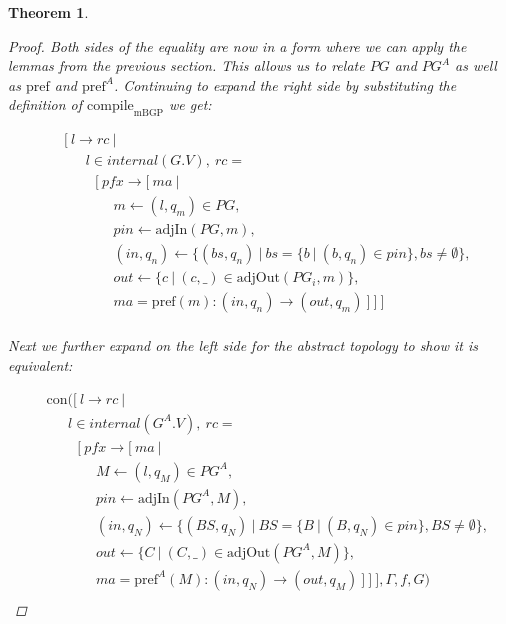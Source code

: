 \documentclass[twocolumn, openany]{sig-alternate-10pt}
\newcommand{\Con}{\mathrm{con}}
\newcommand{\CompileMbgp}{\ensuremath{\mathrm{compile}_\mathrm{mBGP}}}
\newcommand{\Pref}{\ensuremath{\mathrm{pref}}}
\newtheorem{thm}{Theorem}
\begin{document}
\begin{thm}
\begin{proof}
    Both sides of the equality are now in a form where we can apply the lemmas from the previous section.
    This allows us to relate $PG$ and $PG^A$ as well as $\Pref$ and $\Pref^A$.
    Continuing to expand the right side by substituting the definition of $\CompileMbgp$ we get: 

  \[ \begin{array}{l}
     ~~~~~ [~ l \rightarrow rc ~\vert~ \\
     ~~~~~~~~~~~~ l \in internal(G.V), ~rc =  \\
     ~~~~~~~~~~~~~~~ [~ pfx \rightarrow [~ ma ~\vert~ \\
     ~~~~~~~~~~~~~~~~~~~~~ m \leftarrow (l,q_m) \in PG, \\
     ~~~~~~~~~~~~~~~~~~~~~ pin \leftarrow \text{adjIn}(PG,m), \\
     ~~~~~~~~~~~~~~~~~~~~~ (in,q_n) \leftarrow \{ (bs,q_n) ~\vert~ bs=\{b ~\vert~ (b,q_n) \in pin \}, bs \neq \emptyset \}, \\
     ~~~~~~~~~~~~~~~~~~~~~ out \leftarrow \{ c ~\vert~ (c,\_) \in \text{adjOut}(PG_i,m) \}, \\
     ~~~~~~~~~~~~~~~~~~~~~ ma = \Pref(m) : (in,q_n) \rightarrow (out,q_m) ~] ~] ~]\\
  \end{array} \]%

  Next we further expand on the left side for the abstract topology to show it is equivalent:

  \[ \begin{array}{l}
     ~~~~~ \Con([~ l \rightarrow rc ~\vert~ \\
     ~~~~~~~~~~~~ l \in internal(G^A.V), ~rc =  \\
     ~~~~~~~~~~~~~~~ [~ pfx \rightarrow [~ ma ~\vert~ \\
     ~~~~~~~~~~~~~~~~~~~~~ M \leftarrow (l,q_M) \in PG^A, \\
     ~~~~~~~~~~~~~~~~~~~~~ pin \leftarrow \text{adjIn}(PG^A,M), \\
     ~~~~~~~~~~~~~~~~~~~~~ (in,q_N) \leftarrow \{ (BS,q_N) ~\vert~ BS=\{B ~\vert~ (B,q_N) \in pin \}, BS \neq \emptyset \}, \\
     ~~~~~~~~~~~~~~~~~~~~~ out \leftarrow \{ C ~\vert~ (C,\_) \in \text{adjOut}(PG^A,M) \}, \\
     ~~~~~~~~~~~~~~~~~~~~~ ma = \Pref^A(M) : (in,q_N) \rightarrow (out,q_M) ~] ~] ~], \Gamma, f, G) \\
  \end{array} \]%


\end{proof}
\end{thm}
\end{document}
